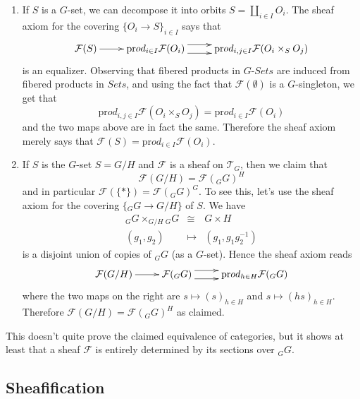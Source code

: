 \begin{enumerate}
\item 
If $S$ is a $G$-set, we can decompose it into orbits $S = \coprod_{i\in I} O_i$. The sheaf axiom for the covering $\{O_i \to S\}_{i\in I}$ says that 
$$
\xymatrix{
\mathcal{F}(S) \ar[r] &
\text{pr}od_{i\in I} \mathcal{F}(O_i) \ar@<1ex>[r] \ar@<-1ex>[r] &
\text{pr}od_{i,j \in I} \mathcal{F}(O_i \times_S O_j)
}
$$
is an equalizer. Observing that fibered products in $G\textit{-Sets}$ are induced from fibered products in $\textit{Sets}$, and using the fact that $\mathcal{F}(\emptyset)$ is a $G$-singleton, we get that 
$$
\text{pr}od_{i,j \in I} \mathcal{F}(O_i \times_S O_j) = \text{pr}od_{i \in I} \mathcal{F}(O_i)
$$
and the two maps above are in fact the same. Therefore the sheaf axiom merely says that $\mathcal{F}(S) = \text{pr}od_{i\in I} \mathcal{F}(O_i)$.
\item
If $S$ is the $G$-set $S= G/H$ and $\mathcal{F}$ is a sheaf on $\mathcal{T}_G$, then we claim that
$$
\mathcal{F}(G/H) = \mathcal{F}({}_G G)^H
$$
and in particular $\mathcal{F}(\{*\}) = \mathcal{F}({}_G G)^G$. To see this, let's use the sheaf axiom for the covering $\{ {}_G G \to G/H \}$ of $S$. We have 
\begin{eqnarray*}
{}_G G  \times_{G/H} {}_G G & \cong & G \times H \\
(g_1, g_2) & \longmapsto & (g_1, g_1 g_2^{-1})
\end{eqnarray*}
is a disjoint union of copies of ${}_G G$ (as a $G$-set). Hence the sheaf axiom reads
$$
\xymatrix{
\mathcal{F} (G/H) \ar[r] &
\mathcal{F}({}_G G) \ar@<1ex>[r] \ar@<-1ex>[r] &
\text{pr}od_{h\in H} \mathcal{F}({}_G G)
}
$$
where the two maps on the right are $s \mapsto  (s)_{h \in H}$ and $s \mapsto  (hs)_{h \in H}$. Therefore $\mathcal{F}(G/H) = \mathcal{F}({}_G G)^H$ as claimed.
\end{enumerate}
This doesn't quite prove the claimed equivalence of categories, but it shows at least that a sheaf $\mathcal{F}$ is entirely determined by its sections over ${}_G G$.

\subsection{Sheafification}

